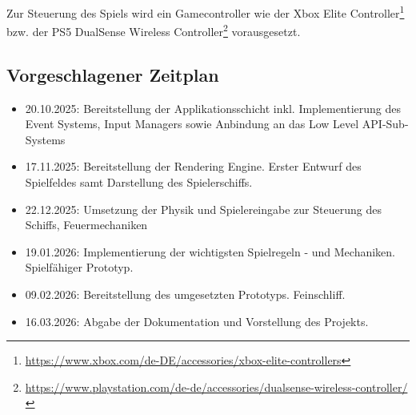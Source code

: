 \noindent
Zur Steuerung des Spiels wird ein Gamecontroller wie der Xbox Elite Controller\footnote{
\url{https://www.xbox.com/de-DE/accessories/xbox-elite-controllers}
} bzw. der PS5 DualSense Wireless Controller\footnote{
\url{https://www.playstation.com/de-de/accessories/dualsense-wireless-controller/}
} vorausgesetzt.

\subsection{Vorgeschlagener Zeitplan}

\begin{itemize}
\itemsep0.5em
\item 20.10.2025: Bereitstellung der Applikationsschicht inkl. Implementierung des Event Systems, Input Managers sowie Anbindung an das Low Level API-Sub-Systems
\item 17.11.2025: Bereitstellung der Rendering Engine. Erster Entwurf des Spielfeldes samt Darstellung des Spielerschiffs.
\item 22.12.2025: Umsetzung der Physik und Spielereingabe zur Steuerung des Schiffs, Feuermechaniken
\item 19.01.2026: Implementierung der wichtigsten Spielregeln - und Mechaniken. Spielfähiger Prototyp.
\item 09.02.2026: Bereitstellung des umgesetzten Prototyps. Feinschliff.
\item 16.03.2026: Abgabe der Dokumentation und Vorstellung des Projekts.
\end{itemize}
